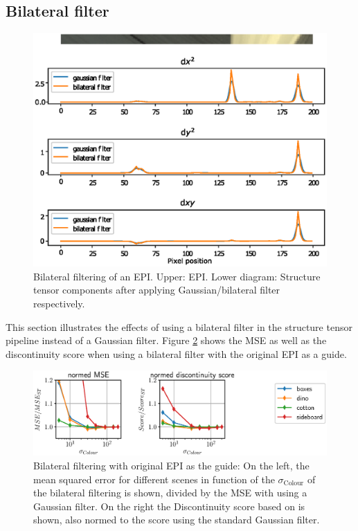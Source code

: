 \documentclass  [
  paper    = a4,
  BCOR     = 10mm,
  twoside,
  fontsize = 12pt,
  fleqn,
  toc      = bibnumbered,
  toc      = listofnumbered,
  numbers  = noendperiod,
  headings = normal,
  listof   = leveldown,
  version  = 3.03
]                                       {scrreprt}
\begin{document}
\subsection{Bilateral filter}
\begin{figure}[h!]
	\centering
	\includegraphics[width=0.7\linewidth]{images/bilat}
	\caption[Bilateral filtering]{Bilateral filtering of an EPI. Upper: EPI. Lower diagram: Structure tensor components after applying Gaussian/bilateral filter respectively.}
	\label{fig:bilat}
\end{figure}
 This section illustrates the effects of using a bilateral filter in the structure tensor pipeline instead of a Gaussian filter. Figure \ref{fig:bilateralparams} shows the MSE as well as the discontinuity score when using a bilateral filter with the original EPI as a guide.
 \begin{figure}[h!]
 	\centering
 	\includegraphics[width=1\linewidth]{images/bilateral_params}
 	\caption[Parameter dependency for bilateral filtering using EPI]{Bilateral filtering with original EPI as the guide: On the left, the mean squared error for different scenes in function of the $\sigma_\text{Colour}$ of the bilateral filtering is shown, divided by the MSE with using a Gaussian filter. On the right the Discontinuity score based on \cite{honauer2016benchmark} is shown, also normed to the score using the standard Gaussian filter.}
 	\label{fig:bilateralparams}
 \end{figure}
\end{document}
